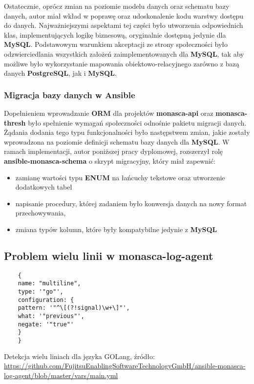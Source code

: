     Ostatecznie, oprócz zmian na poziomie modelu danych oraz schematu bazy danych, autor miał wkład w poprawę oraz udoskonalenie
    kodu warstwy dostępu do danych. Najważniejszymi aspektami tej części było utworzenia odpowiednich klas, implementujących logikę
    biznesową, oryginalnie dostępną jedynie dla \textbf{MySQL}. Podstawowym warunkiem akceptacji ze strony społeczności było
    odzwierciedlania wszystkich założeń zaimplementowanych dla \textbf{MySQL}, tak aby możliwe było wykorzystanie mapowania obiektowo-relacyjnego
    zarówno z bazą danych \textbf{PostgreSQL}, jak i \textbf{MySQL}.
    
    \subsubsection{Migracja bazy danych w Ansible}
    Dopełnieniem wprowadzanie \textbf{ORM} dla projektów \textbf{monasca-api} oraz \textbf{monasca-thresh} było spełnienie
    wymagań społeczności odnośnie pakietu migracji danych. Żądania dodania tego typu funkcjonalności było następstwem zmian, jakie
    zostały wprowadzona na poziomie definicji schematu bazy danych dla \textbf{MySQL}. W ramach implementacji, autor poniższej pracy dyplomowej,
    rozszerzył rolę \textbf{ansible-monasca-schema} o skrypt migracyjny, który miał zapewnić:
    \begin{itemize}
        \item zamianę wartości typu \textbf{ENUM} na łańcuchy tekstowe oraz utworzenie dodatkowych tabel
        \item napisanie procedury, której zadaniem było konwersja danych na nowy format przechowywania,
        \item zmiana typów kolumn, które były kompatybilne jedynie z \textbf{MySQL}
    \end{itemize}

\subsection{Problem wielu linii w monasca-log-agent}
\label{chapter:application:own_work:monasca_log_agent}

\begin{listing}[h]
    \begin{verbatim}
    {
    name: "multiline",
    type: '"go"',
    configuration: {
    pattern: '"^\[(?!signal)\w+\]"',
    what: '"previous"',
    negate: '"true"'
    }
    }
    \end{verbatim}
    \caption[Detekcja wielu liniach dla języka GOLang]{
        Detekcja wielu liniach dla języka GOLang, źródło: \url{https://github.com/FujitsuEnablingSoftwareTechnologyGmbH/ansible-monasca-log-agent/blob/master/vars/main.yml}}
    \label{chapter:application:own_work:monasca_log_agent:filter_example}
\end{listing}

